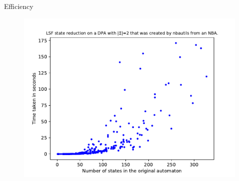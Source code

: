 \begin{frame}{Efficiency}
\begin{figure}
	\centering
	\includegraphics[page=6,height=.8\textheight]{../data/analysis/lsf/detnbaut_ap1.pdf} 
\end{figure}
\end{frame}















